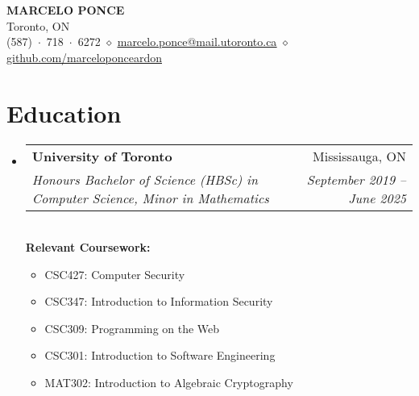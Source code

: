 \documentclass[letterpaper,11pt]{article}
\makeatletter
\newcommand{\resumeItem}[1]{
  \item\small{
    {#1 \vspace{-2pt}}
  }
}
\newcommand{\resumeSubheading}[4]{
  \vspace{-2pt}\item
    \begin{tabular*}{0.97\textwidth}[t]{l@{\extracolsep{\fill}}r}
      \textbf{#1} & #2 \\
      \textit{\small#3} & \textit{\small #4} \\
    \end{tabular*}\vspace{-7pt}
}
\newcommand{\resumeSubHeadingListStart}{\begin{itemize}[leftmargin=0.15in, label={}]}
\newcommand{\resumeSubHeadingListEnd}{\end{itemize}}
\newcommand{\resumeItemListStart}{\begin{itemize}}
\newcommand{\resumeItemListEnd}{\end{itemize}\vspace{-5pt}}
\makeatother
\begin{document}

\begin{center}
    \textbf{\Huge \scshape MARCELO PONCE} \\ \vspace{1pt}
    \small Toronto, ON \\
    \small (587)~$\cdot$~718~$\cdot$~6272 $\diamond$ \href{mailto:marcelo.ponce@mail.utoronto.ca}{\underline{marcelo.ponce@mail.utoronto.ca}} $\diamond$
    \href{https://github.com/marceloponceardon}{\underline{github.com/marceloponceardon}}
\end{center}


\section{Education}
  \resumeSubHeadingListStart
    \resumeSubheading
      {University of Toronto}{Mississauga, ON}
      {Honours Bachelor of Science (HBSc) in Computer Science, Minor in Mathematics}{September 2019 -- June 2025} \\
      \vspace{8pt}
      \textbf{Relevant Coursework:}
      \noexpandtab
      \resumeItemListStart
	      \resumeItem{CSC427: Computer Security}
	      \resumeItem{CSC347: Introduction to Information Security}
	      \resumeItem{CSC309: Programming on the Web}
	      \resumeItem{CSC301: Introduction to Software Engineering}
	      \resumeItem{MAT302: Introduction to Algebraic Cryptography}
      \resumeItemListEnd
  \resumeSubHeadingListEnd


\end{document}

